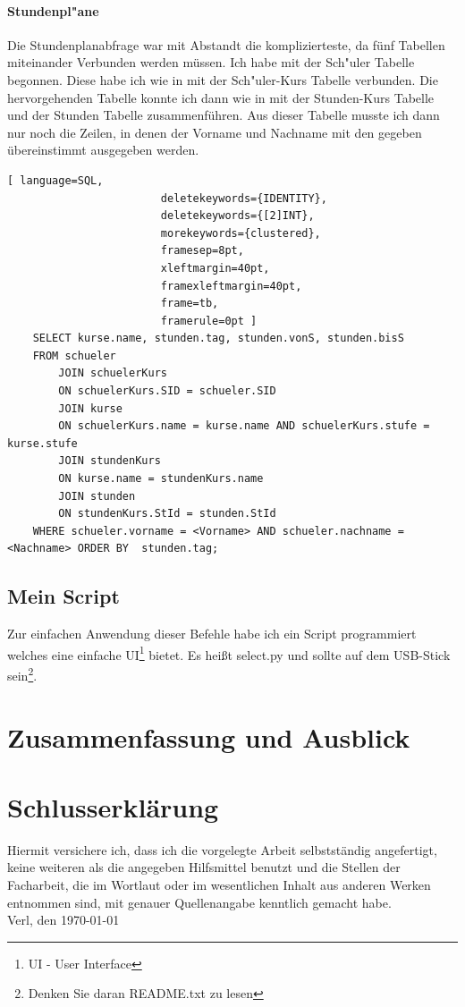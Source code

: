 \documentclass[a4paper, 12pt]{article}
\theoremstyle{plain}
\theoremstyle{definition}
\begin{document}
	\paragraph{Stundenpl"ane} Die Stundenplanabfrage war mit Abstandt die komplizierteste, da fünf Tabellen miteinander Verbunden werden müssen. Ich habe mit der Sch"uler Tabelle begonnen. Diese habe ich wie in  mit der Sch"uler-Kurs Tabelle verbunden. Die hervorgehenden Tabelle konnte ich dann wie in  mit der Stunden-Kurs Tabelle und der Stunden Tabelle zusammenführen. Aus dieser Tabelle musste ich dann nur noch die Zeilen, in denen der Vorname und Nachname mit den gegeben übereinstimmt ausgegeben werden.
	\begin{lstlisting}[ language=SQL,
	                    deletekeywords={IDENTITY},
	                    deletekeywords={[2]INT},
	                    morekeywords={clustered},
	                    framesep=8pt,
	                    xleftmargin=40pt,
	                    framexleftmargin=40pt,
	                    frame=tb,
	                    framerule=0pt ]	
    SELECT kurse.name, stunden.tag, stunden.vonS, stunden.bisS
    FROM schueler 
        JOIN schuelerKurs
        ON schuelerKurs.SID = schueler.SID
        JOIN kurse 
        ON schuelerKurs.name = kurse.name AND schuelerKurs.stufe = kurse.stufe
        JOIN stundenKurs
        ON kurse.name = stundenKurs.name
        JOIN stunden
        ON stundenKurs.StId = stunden.StId
    WHERE schueler.vorname = <Vorname> AND schueler.nachname = <Nachname> ORDER BY  stunden.tag;
	\end{lstlisting}	
	\subsection{Mein Script}
	Zur einfachen Anwendung dieser Befehle habe ich ein Script programmiert welches eine einfache UI\footnote{UI - User Interface} bietet. Es heißt select.py und sollte auf dem USB-Stick sein\footnote{Denken Sie daran README.txt zu lesen}.
	\newpage
	\section{Zusammenfassung und Ausblick}
	\label{sec:end}
	\newpage
	\printbibliography	
	\appendix
	
	\newpage
	\section*{Schlusserklärung}
	Hiermit versichere ich, dass ich die vorgelegte Arbeit selbstständig angefertigt, keine weiteren als die angegeben	 Hilfsmittel benutzt und die Stellen der Facharbeit, die im Wortlaut oder im wesentlichen Inhalt aus anderen Werken entnommen sind, mit genauer Quellenangabe kenntlich gemacht habe.\\
	\vspace{4cm}
	Verl, den \today
\end{document}
